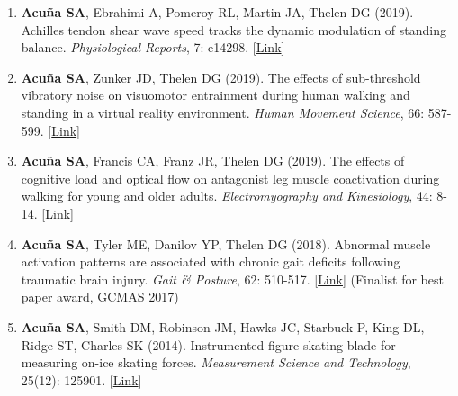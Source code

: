 \documentclass[letterpaper, 10pt]{article}
\begin{document}
\begin{enumerate}
    \item \textbf{Acuña SA}, Ebrahimi A, Pomeroy RL, Martin JA, Thelen DG (2019). Achilles tendon shear wave speed tracks the dynamic modulation of standing balance. \textit{Physiological Reports}, 7: e14298. [\href{https://physoc.onlinelibrary.wiley.com/doi/full/10.14814/phy2.14298}{Link}]
    \item \textbf{Acuña SA}, Zunker JD, Thelen DG (2019). The effects of sub-threshold vibratory noise on visuomotor entrainment during human walking and standing in a virtual reality environment. \textit{Human Movement Science}, 66: 587-599. [\href{https://www.sciencedirect.com/science/article/abs/pii/S0167945719300582}{Link}]
    \item \textbf{Acuña SA}, Francis CA, Franz JR, Thelen DG (2019). The effects of cognitive load and optical ﬂow on antagonist leg muscle coactivation during walking for young and older adults. \textit{Electromyography and Kinesiology}, 44: 8-14. [\href{https://www.sciencedirect.com/science/article/abs/pii/S1050641118303122}{Link}]
    \item \textbf{Acuña SA}, Tyler ME, Danilov YP, Thelen DG (2018). Abnormal muscle activation patterns are associated with chronic gait deﬁcits following traumatic brain injury. \textit{Gait \& Posture}, 62: 510-517. [\href{https://www.sciencedirect.com/science/article/abs/pii/S096663621830359X}{Link}] (Finalist for best paper award, GCMAS 2017)
    \item \textbf{Acuña SA}, Smith DM, Robinson JM, Hawks JC, Starbuck P, King DL, Ridge ST, Charles SK (2014). Instrumented ﬁgure skating blade for measuring on-ice skating forces. \textit{Measurement Science and Technology}, 25(12): 125901. [\href{https://iopscience.iop.org/article/10.1088/0957-0233/25/12/125901}{Link}]
\end{enumerate}
\end{document}
